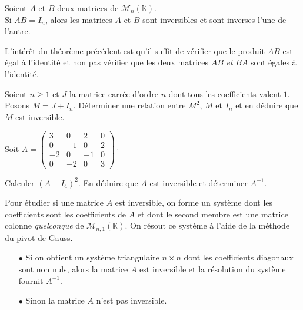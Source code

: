 \documentclass[a4paper,10pt]{report}
\begin{document}
\medskip

\begin{thm}
Soient $A$ et $B$ deux matrices de $\mathcal{M}_n(\mathbb{K})$.\\
Si $AB=I_n$, alors les matrices $A$ et $B$ sont inversibles et sont inverses l'une de l'autre.
\end{thm}

\begin{rem} 
L'intérêt du théorème précédent est qu'il suffit de vérifier que le produit $AB$ est égal à l'identité et non pas vérifier que les deux matrices $AB$ \textit{et} $BA$ sont égales à l'identité.
\end{rem}

\begin{ex} Soient $n \geq 1$ et $J$ la matrice carrée d'ordre $n$ dont tous les coefficients valent $1$. Posons $M=J+ I_n$. Déterminer une relation entre $M^2$, $M$ et $I_n$ et en déduire que $M$ est inversible.

\vspace{7cm}
\end{ex}

\medskip

\begin{exa}
Soit $A=\begin{pmatrix}
3& 0 & 2 & 0\\
0 & -1 & 0 & 2\\
-2 & 0& -1 & 0\\
0 & -2 & 0 & 3
\end{pmatrix} \cdot$

\noindent Calculer $(A-I_4)^2$. En déduire que $A$ est inversible et déterminer $A^{-1}$. 
%
\end{exa}

\begin{metho}
Pour étudier si une matrice $A$ est inversible, on forme un système dont les coefficients sont les coefficients de $A$ et dont le second membre est une matrice colonne \textit{quelconque} de $\mathcal{M}_{n,1}(\mathbb{K}).$ On résout ce système à l'aide de la méthode du pivot de Gauss. 
 \begin{enumerate}
  \item[$\bullet$]   Si on obtient un système triangulaire $n \times n$ dont les coefficients diagonaux sont non nuls, alors la matrice $A$ est inversible et la résolution du système fournit $A^{-1}$.
  \item[$\bullet$] Sinon la matrice $A$ n'est pas inversible. 
 \end{enumerate}
\end{metho}
\end{document}
